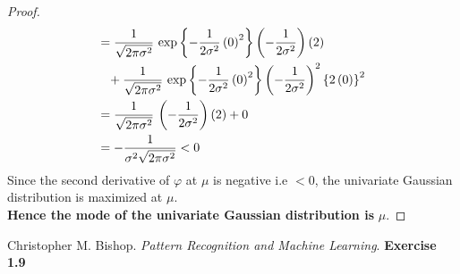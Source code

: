 \documentclass[14pt]{extarticle}
\begin{document}
\begin{flushleft}
\begin{proof}
\begin{align}
&= \frac{1}{\sqrt{2\pi\sigma^2}}\, \exp\left\lbrace-\frac{1}{2\sigma^2}\left(0\right)^2\right\rbrace \left(-\frac{1}{2\sigma^2}\right) \left(2\right) \\
& \,\,\,\,\,+ \frac{1}{\sqrt{2\pi\sigma^2}}\, \exp\left\lbrace-\frac{1}{2\sigma^2}\left(0\right)^2\right\rbrace \left(-\frac{1}{2\sigma^2}\right)^2 \left\lbrace2\left(0\right)\right\rbrace^2{\notag}\\
&= \frac{1}{\sqrt{2\pi\sigma^2}}\,\left(-\frac{1}{2\sigma^2}\right) \left(2\right) + 0\\
&= -\frac{1}{\sigma^2\sqrt{2\pi\sigma^2}} < 0
\end{align}
Since the second derivative of $\varphi$ at $\mu$ is negative i.e $< 0$, the univariate Gaussian distribution is maximized at $\mu$.\\
\hfill \break
\textbf{Hence the mode of the univariate Gaussian distribution is} $\mu$.
\end{proof}	
\end{flushleft}
\begin{thebibliography}{9}
Christopher M. Bishop. 
\textit{ Pattern Recognition and Machine Learning}.  
\textbf{Exercise 1.9}
\end{thebibliography}
\end{document}

